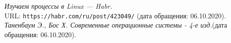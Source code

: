 
\begin{thebibliography}{99}
{\itshape Изучаем процессы в Linux — Habr.} \\URL: \texttt{https://habr.com/ru/post/423049/} (дата обращения: 06.10.2020).
{\itshape Таненбаум Э., Бос Х. Современные операционные системы - 4-е изд.}(дата обращения: 06.10.2020).
\end{thebibliography}
\pagebreak